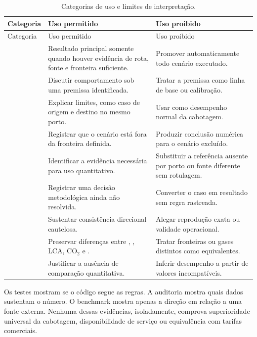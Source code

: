 \begingroup
\small
\setlength{\LTleft}{0pt}
\setlength{\LTright}{0pt}
\setlength{\tabcolsep}{4pt}
\renewcommand{\arraystretch}{1.15}
\begin{longtable}{L{0.29\textwidth}L{0.32\textwidth}L{0.31\textwidth}}
\caption{Categorias de uso e limites de interpretação.}
\label{tab:categorias-uso}\\
\toprule
Categoria & Uso permitido & Uso proibido \\
\midrule
\endfirsthead
\toprule
Categoria & Uso permitido & Uso proibido \\
\midrule
\endhead
{} & Resultado principal somente quando houver evidência de rota, fonte e fronteira suficiente. & Promover automaticamente todo cenário executado.\\
 & Discutir comportamento sob uma premissa identificada. & Tratar a premissa como linha de base ou calibração.\\
 & Explicar limites, como caso de origem e destino no mesmo porto. & Usar como desempenho normal da cabotagem.\\
 & Registrar que o cenário está fora da fronteira definida. & Produzir conclusão numérica para o cenário excluído.\\
 & Identificar a evidência necessária para uso quantitativo. & Substituir a referência ausente por porto ou fonte diferente sem rotulagem.\\
 & Registrar uma decisão metodológica ainda não resolvida. & Converter o caso em resultado sem regra rastreada.\\
 & Sustentar consistência direcional cautelosa. & Alegar reprodução exata ou validade operacional.\\
 & Preservar diferenças entre \ttw{}, \wtw{}, LCA, CO$_2$ e \cooe{}. & Tratar fronteiras ou gases distintos como equivalentes.\\
 & Justificar a ausência de comparação quantitativa. & Inferir desempenho a partir de valores incompatíveis.\\
\bottomrule
\end{longtable}
\endgroup

Os testes mostram se o código segue as regras. A auditoria mostra quais dados sustentam o número. O benchmark mostra apenas a direção em relação a uma fonte externa. Nenhuma dessas evidências, isoladamente, comprova superioridade universal da cabotagem, disponibilidade de serviço ou equivalência com tarifas comerciais.
